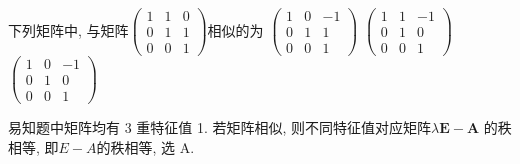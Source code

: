 \documentclass[kindlepaper]{BHCexam4kindle}
\begin{document}
\begin{questions}
		\qs 下列矩阵中, 与矩阵$\left(\begin{array}{lll}{1} & {1} & {0} \\ {0} & {1} & {1} \\ {0} & {0} & {1}\end{array}\right)$相似的为\xx
				{$\left(\begin{array}{ccc}{1} & {0} & {-1} \\ {0} & {1} & {1} \\ {0} & {0} & {1}\end{array}\right)$}
					{$\left(\begin{array}{ccc}{1} & {1} & {-1} \\ {0} & {1} & {0} \\ {0} & {0} & {1}\end{array}\right)$}
						{$\left(\begin{array}{ccc}{1} & {0} & {-1} \\ {0} & {1} & {0} \\ {0} & {0} & {1}\end{array}\right)$}
		\begin{solution}
			易知题中矩阵均有 3 重特征值 1. 若矩阵相似, 则不同特征值对应矩阵$\lambda \boldsymbol{E}-\boldsymbol{A}$
			的秩相等, 即$E-A$的秩相等, 选 A.
		\end{solution}


\end{questions}
\end{document}
